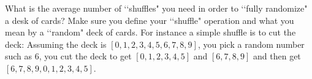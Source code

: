   What is the average number of \lq\lq shuffles" you need in order
  to \lq\lq fully randomize" a desk of cards?
  Make sure you define your \lq\lq shuffle" operation and what you
  mean by a \lq\lq random" deck of cards.
  For instance a simple shuffle is to cut the deck:
  Assuming the deck is $[0,1,2,3,4,5,6,7,8,9]$, you pick a random number such as $6$,
  you cut the deck to get $[0,1,2,3,4,5]$ and $[6,7,8,9]$
  and then get $[6,7,8,9,0,1,2,3,4,5]$.
